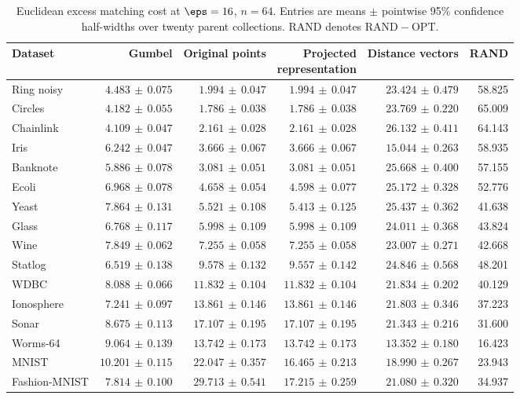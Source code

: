 \begin{table}[p]
\centering\scriptsize
\setlength{\tabcolsep}{3pt}
\caption{Euclidean excess matching cost at $\eps=16$, $n=64$. Entries are means $\pm$ pointwise 95\% confidence half-widths over twenty parent collections. RAND denotes $\mathrm{RAND}-\mathrm{OPT}$.}
\label{tab:exp-bench-p1-eps16}
\begin{tabular}{lrrrrr}
\toprule
Dataset & Gumbel & Original points & \shortstack{Projected\\representation} & Distance vectors & RAND\\
\midrule
Ring noisy & $4.483\,\pm\,0.075$ & $1.994\,\pm\,0.047$ & $1.994\,\pm\,0.047$ & $23.424\,\pm\,0.479$ & 58.825\\
Circles & $4.182\,\pm\,0.055$ & $1.786\,\pm\,0.038$ & $1.786\,\pm\,0.038$ & $23.769\,\pm\,0.220$ & 65.009\\
Chainlink & $4.109\,\pm\,0.047$ & $2.161\,\pm\,0.028$ & $2.161\,\pm\,0.028$ & $26.132\,\pm\,0.411$ & 64.143\\
Iris & $6.242\,\pm\,0.047$ & $3.666\,\pm\,0.067$ & $3.666\,\pm\,0.067$ & $15.044\,\pm\,0.263$ & 58.935\\
Banknote & $5.886\,\pm\,0.078$ & $3.081\,\pm\,0.051$ & $3.081\,\pm\,0.051$ & $25.668\,\pm\,0.400$ & 57.155\\
Ecoli & $6.968\,\pm\,0.078$ & $4.658\,\pm\,0.054$ & $4.598\,\pm\,0.077$ & $25.172\,\pm\,0.328$ & 52.776\\
Yeast & $7.864\,\pm\,0.131$ & $5.521\,\pm\,0.108$ & $5.413\,\pm\,0.125$ & $25.437\,\pm\,0.362$ & 41.638\\
Glass & $6.768\,\pm\,0.117$ & $5.998\,\pm\,0.109$ & $5.998\,\pm\,0.109$ & $24.011\,\pm\,0.368$ & 43.824\\
Wine & $7.849\,\pm\,0.062$ & $7.255\,\pm\,0.058$ & $7.255\,\pm\,0.058$ & $23.007\,\pm\,0.271$ & 42.668\\
Statlog & $6.519\,\pm\,0.138$ & $9.578\,\pm\,0.132$ & $9.557\,\pm\,0.142$ & $24.846\,\pm\,0.568$ & 48.201\\
WDBC & $8.088\,\pm\,0.066$ & $11.832\,\pm\,0.104$ & $11.832\,\pm\,0.104$ & $21.834\,\pm\,0.202$ & 40.129\\
Ionosphere & $7.241\,\pm\,0.097$ & $13.861\,\pm\,0.146$ & $13.861\,\pm\,0.146$ & $21.803\,\pm\,0.346$ & 37.223\\
Sonar & $8.675\,\pm\,0.113$ & $17.107\,\pm\,0.195$ & $17.107\,\pm\,0.195$ & $21.343\,\pm\,0.216$ & 31.600\\
Worms-64 & $9.064\,\pm\,0.139$ & $13.742\,\pm\,0.173$ & $13.742\,\pm\,0.173$ & $13.352\,\pm\,0.180$ & 16.423\\
MNIST & $10.201\,\pm\,0.115$ & $22.047\,\pm\,0.357$ & $16.465\,\pm\,0.213$ & $18.990\,\pm\,0.267$ & 23.943\\
Fashion-MNIST & $7.814\,\pm\,0.100$ & $29.713\,\pm\,0.541$ & $17.215\,\pm\,0.259$ & $21.080\,\pm\,0.320$ & 34.937\\
\bottomrule
\end{tabular}
\end{table}

